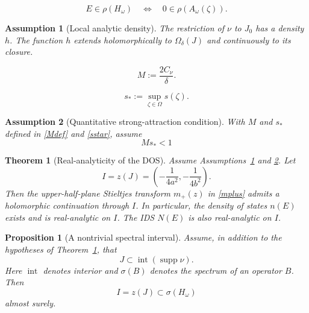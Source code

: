\documentclass[10pt,a4paper]{amsart}
\newtheorem{ass}{Assumption}
\newtheorem{thm}{Theorem}
\newtheorem{prop}{Proposition}
\newcommand{\Om}{\Omega}
\newcommand{\supp}{\operatorname{supp}}
\begin{document}
\begin{equation}
 E\in\rho(H_\omega)\quad\Longleftrightarrow\quad
 0\in\rho(A_\omega(\zeta)).
\label{spectral-correspondence}
\end{equation}

\begin{ass}[Local analytic density]\label{ass:density}
The restriction of $\nu$ to $J_0$ has a density $h$.  The function $h$
extends holomorphically to $\Om_\delta(J)$ and continuously to its closure.
\end{ass}

\begin{equation}
M:=\frac{2C_\nu}{\delta}.
\label{Mdef}
\end{equation}

\begin{equation}
s_*:=\sup_{\zeta\in\Om}s(\zeta).
\label{sstar}
\end{equation}

\begin{ass}[Quantitative strong-attraction condition]\label{ass:small}
With $M$ and $s_*$ defined in \eqref{Mdef} and \eqref{sstar}, assume
\begin{equation}
Ms_*<1
\label{smallness-1}
\end{equation}
\end{ass}

\begin{thm}[Real-analyticity of the DOS]\label{thm:main}
Assume Assumptions~\ref{ass:density} and \ref{ass:small}.  Let
\begin{equation}
I=z(J)
 =\left(-\frac{1}{4a^2},-\frac{1}{4b^2}\right).
\label{energy-I}
\end{equation}
Then the upper-half-plane Stieltjes transform $m_+(z)$ in \eqref{mplus}
admits a holomorphic continuation through $I$.  In particular, the density
of states $n(E)$ exists and is real-analytic on $I$.  The IDS $N(E)$ is also
real-analytic on $I$.
\end{thm}

\begin{prop}[A nontrivial spectral interval]\label{prop:spectrum}
Assume, in addition to the hypotheses of Theorem~\ref{thm:main}, that
\begin{equation}
J\subset\operatorname{int}(\supp\nu).
\label{J-support}
\end{equation}
Here $\operatorname{int}$ denotes interior and $\sigma(B)$ denotes the spectrum
of an operator $B$.  Then
$$
I=z(J)\subset\sigma(H_\omega)
$$
almost surely.
\end{prop}
\end{document}
